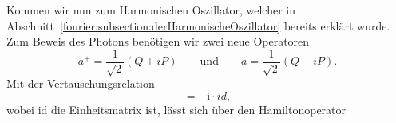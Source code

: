 Kommen wir nun zum Harmonischen Oszillator, welcher in Abschnitt~\ref{fourier:subsection:derHarmonischeOszillator} bereits erklärt wurde.
Zum Beweis des Photons benötigen wir zwei neue Operatoren
\[
a^{+} = \frac{1}{\sqrt{2}}(Q + iP)
\qquad\text{und}\qquad
a = \frac{1}{\sqrt{2}}(Q - iP).
\]
Mit der Vertauschungsrelation
\begin{equation}
	[P,Q] = -\mathrm{i} \cdot id,
\end{equation}
wobei id die Einheitsmatrix ist, lässt sich über den Hamiltonoperator %
